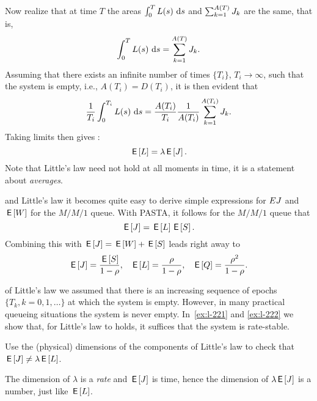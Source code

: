 Now realize that at time $T$ the areas $\int_0^T L(s)\, \,\textrm{d}s$ and $\sum_{k=1}^{A(T)} J_k$ are the same, that is, 
\begin{equation}\label{eq:111}
 \int_0^T L(s)\, \,\textrm{d}s = \sum_{k=1}^{A(T)} J_k.
\end{equation}
Assuming that there exists an infinite number of times $\{T_i\}$,  $T_i\to\infty$, such that the system is empty, i.e.,  $A(T_i) = D(T_i)$, it is then evident that
\begin{equation*}
 \frac 1 {T_i} \int_0^{T_i} L(s)\, \,\textrm{d}s = \frac{A(T_i)} {T_i} \frac{1}{A(T_i)} \sum_{k=1}^{A(T_i)} J_k.
\end{equation*}
Taking limits then gives : 
\begin{equation*}
 \,\mathsf{E}\left[L\right] = \lambda \,\mathsf{E}\left[J\right].
\end{equation*}
Note that Little's law need not hold at all moments in time, it is a statement about \emph{averages}.


 and Little's law it becomes quite easy to derive simple expressions for $EJ$ and $\,\mathsf{E}\left[W\right]$ for the $M/M/1$ queue.
With PASTA, it follows for the $M/M/1$ queue that
\begin{equation}\label{eq:wqes}
 \,\mathsf{E}\left[J\right] = \,\mathsf{E}\left[L\right] \,\mathsf{E}\left[S\right].
\end{equation}
Combining this with $\,\mathsf{E}\left[J\right] = \,\mathsf{E}\left[W\right] + \,\mathsf{E}\left[S\right]$ leads right away to
 \begin{align}\label{eq:110}
 \,\mathsf{E}\left[J\right] &= \frac{\,\mathsf{E}\left[S\right]}{1-\rho}, & \,\mathsf{E}\left[L\right] &= \frac\rho{1-\rho}, & \,\mathsf{E}\left[Q\right] = \frac{\rho^2}{1-\rho}.
 \end{align}


  of Little's law we assumed that there is an increasing sequence of epochs $\{T_k, k=0,1,\ldots\}$ at which the system is empty.
 However, in many practical queueing situations the system is never empty.
 In~\cref{ex:l-221} and \cref{ex:l-222} we show that, for Little's law to holds, it suffices that the system is rate-stable.



\begin{exercise}\label{ex:42}
  Use
  the (physical) dimensions of the components of Little's law to check that $\,\mathsf{E}\left[J\right] \neq \lambda \,\mathsf{E}\left[L\right]$.
\begin{solution}
  The dimension of $\lambda$ is a \emph{rate} and $\,\mathsf{E}\left[J\right]$ is time, hence the dimension of $\lambda \,\mathsf{E}\left[J\right]$ is a number, just like $\,\mathsf{E}\left[L\right]$.
\end{solution}
\end{exercise}


